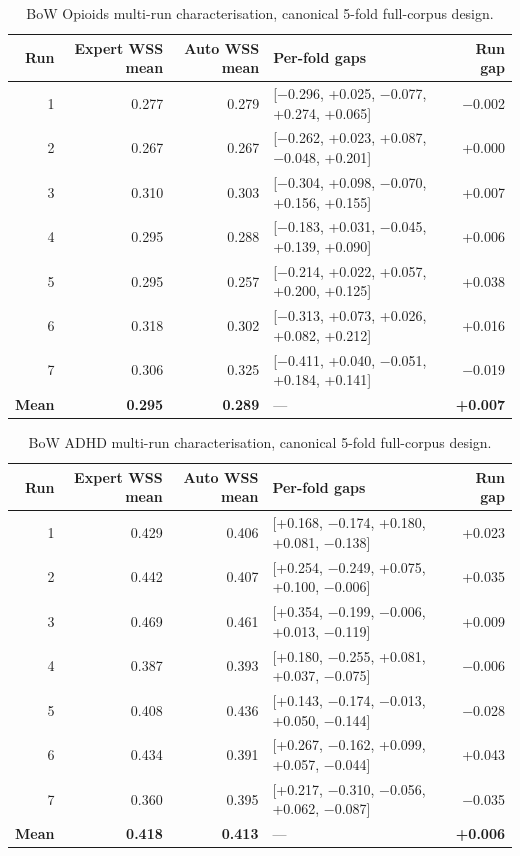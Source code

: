 \documentclass{article}
\begin{document}
\begin{table}[t]
\centering
\small
\begin{tabular}{rrrlr}
\toprule
Run & Expert WSS mean & Auto WSS mean & Per-fold gaps & Run gap \\
\midrule
1 & 0.277 & 0.279 & [$-$0.296, +0.025, $-$0.077, +0.274, +0.065] & $-$0.002 \\
2 & 0.267 & 0.267 & [$-$0.262, +0.023, +0.087, $-$0.048, +0.201] & +0.000 \\
3 & 0.310 & 0.303 & [$-$0.304, +0.098, $-$0.070, +0.156, +0.155] & +0.007 \\
4 & 0.295 & 0.288 & [$-$0.183, +0.031, $-$0.045, +0.139, +0.090] & +0.006 \\
5 & 0.295 & 0.257 & [$-$0.214, +0.022, +0.057, +0.200, +0.125] & +0.038 \\
6 & 0.318 & 0.302 & [$-$0.313, +0.073, +0.026, +0.082, +0.212] & +0.016 \\
7 & 0.306 & 0.325 & [$-$0.411, +0.040, $-$0.051, +0.184, +0.141] & $-$0.019 \\
\midrule
\textbf{Mean} & \textbf{0.295} & \textbf{0.289} & --- & \textbf{+0.007} \\
\bottomrule
\end{tabular}
\caption{BoW Opioids multi-run characterisation, canonical 5-fold full-corpus design.}
\label{tab:bow_opiods_multirun}
\end{table}

\begin{table}[t]
\centering
\small
\begin{tabular}{rrrlr}
\toprule
Run & Expert WSS mean & Auto WSS mean & Per-fold gaps & Run gap \\
\midrule
1 & 0.429 & 0.406 & [+0.168, $-$0.174, +0.180, +0.081, $-$0.138] & +0.023 \\
2 & 0.442 & 0.407 & [+0.254, $-$0.249, +0.075, +0.100, $-$0.006] & +0.035 \\
3 & 0.469 & 0.461 & [+0.354, $-$0.199, $-$0.006, +0.013, $-$0.119] & +0.009 \\
4 & 0.387 & 0.393 & [+0.180, $-$0.255, +0.081, +0.037, $-$0.075] & $-$0.006 \\
5 & 0.408 & 0.436 & [+0.143, $-$0.174, $-$0.013, +0.050, $-$0.144] & $-$0.028 \\
6 & 0.434 & 0.391 & [+0.267, $-$0.162, +0.099, +0.057, $-$0.044] & +0.043 \\
7 & 0.360 & 0.395 & [+0.217, $-$0.310, $-$0.056, +0.062, $-$0.087] & $-$0.035 \\
\midrule
\textbf{Mean} & \textbf{0.418} & \textbf{0.413} & --- & \textbf{+0.006} \\
\bottomrule
\end{tabular}
\caption{BoW ADHD multi-run characterisation, canonical 5-fold full-corpus design.}
\label{tab:bow_adhd_multirun}
\end{table}
\end{document}
